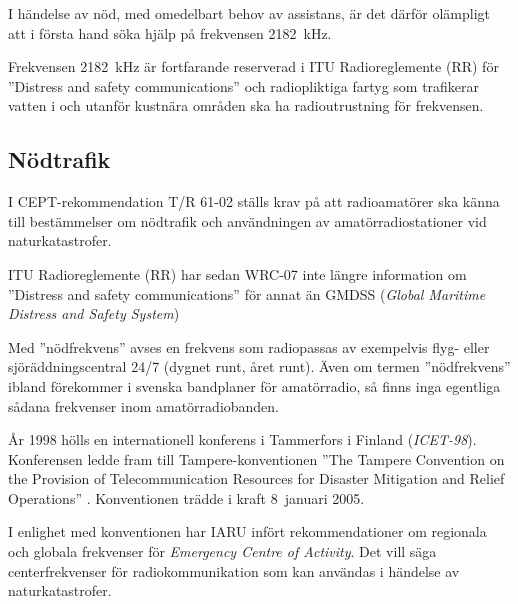 \begin{center}
\begin{minipage}{0.19\columnwidth}
\Huge{\selectfont{}\relax}
\end{minipage}
\begin{minipage}{0.7\columnwidth}
I händelse av nöd, med omedelbart behov av assistans, är det därför
olämpligt att i första hand söka hjälp på frekvensen \qty{2182}{\kilo\hertz}.
\end{minipage}
\end{center}

Frekvensen \qty{2182}{\kilo\hertz} är fortfarande reserverad i ITU
Radioreglemente (RR) \cite{ITU-RR} för ''Distress and safety communications''
och radiopliktiga fartyg som trafikerar vatten i och utanför kustnära områden
ska ha radioutrustning för frekvensen.

\subsection{Nödtrafik}
\label{subsec:noedtrafik}

I CEPT-rekommendation T/R 61-02 \cite{TR6102} ställs krav på att radioamatörer
ska känna till bestämmelser om nödtrafik och användningen av
amatörradiostationer vid naturkatastrofer.

ITU Radioreglemente (RR) \cite{ITU-RR} har sedan WRC-07 inte längre information
om ''Distress and safety communications'' för annat än
GMDSS (\emph{Global Maritime Distress and Safety System})

Med ''nödfrekvens'' avses en frekvens som radiopassas av exempelvis flyg- eller
sjöräddningscentral 24/7 (dygnet runt, året runt).
Även om termen ''nödfrekvens'' ibland förekommer i svenska bandplaner för
amatörradio, så finns inga egentliga sådana frekvenser inom amatörradiobanden.

År 1998 hölls en internationell konferens i Tammerfors i Finland
(\emph{ICET-98}).
Konferensen ledde fram till Tampere-konventionen ''The Tampere Convention on
the Provision of Telecommunication Resources for Disaster Mitigation and Relief
Operations'' \cite{TampereConvention}.
Konventionen trädde i kraft 8~januari 2005.

I enlighet med konventionen har IARU infört rekommendationer om regionala och
globala frekvenser för \emph{Emergency Centre of Activity}.
Det vill säga centerfrekvenser för radiokommunikation som kan användas i
händelse av naturkatastrofer.

